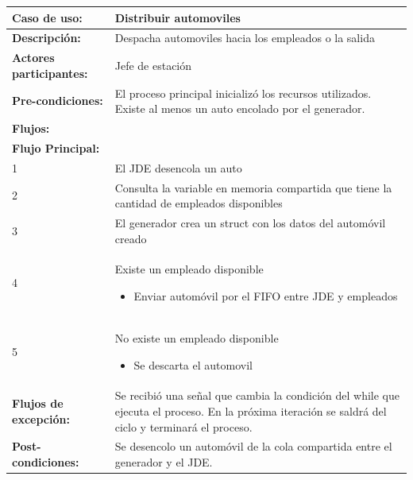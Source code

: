 \documentclass[12pt,a4paper,spanish]{article}
\begin{document}
	\begin{tabular}{|p{4cm}|p{12cm}|}
    \hline
    \textbf{Caso de uso:} & Distribuir automoviles \\
    \hline
    \textbf{Descripción:} &  Despacha automoviles hacia los empleados o la salida\\
    \hline
    \textbf{Actores participantes:} & Jefe de estación  \\
    \hline
 
    \textbf{Pre-condiciones:} &  El proceso principal inicializó los recursos utilizados. Existe 
    al menos un auto encolado por el generador.\\
    \hline
    \hline
    \textbf{Flujos:} &\\
    \hline
	\textbf{Flujo Principal:} &\\ 

	\hline
	1 & El JDE desencola un auto\\
	\hline
	2 & Consulta la variable en memoria compartida que tiene la cantidad de empleados disponibles\\
	\hline
	3 & El generador crea un struct con los datos del automóvil creado\\
	\hline
	4 & Existe un empleado disponible
		\begin{itemize}
			\item Enviar automóvil por el FIFO entre JDE y empleados 
		\end{itemize}
		\\
	\hline
	5 & No existe un empleado disponible
		\begin{itemize}
			\item Se descarta el automovil
		\end{itemize}
		\\
	\hline
	\hline
	\textbf{Flujos de excepción:} & Se recibió una señal que cambia la condición del while que ejecuta el proceso. En la próxima iteración se saldrá del ciclo y terminará el proceso.\\
    \hline

    \hline
	\textbf{Post-condiciones:} & Se desencolo un automóvil de la cola compartida entre el generador y el JDE.\\
	\hline
	\end{tabular}

	\newpage
\end{document}
